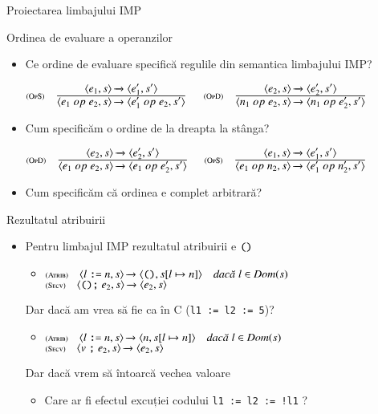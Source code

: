 \documentclass[xcolor=pdftex,romanian,colorlinks]{beamer}
\begin{document}
\begin{section}{Proiectarea limbajului IMP}
\begin{frame}{Ordinea de evaluare a operanzilor}
\begin{itemize}
\item Ce ordine de evaluare specifică regulile din semantica limbajului IMP?
\begin{itemize}
\vitem[] $\reg[OpS]{\Ss{\c{e_1 \mathrel{op} e_2,\stare}}{\c{e_1' \mathrel{op} e_2,\stare'}}}{\Ss{\c{e_1,\stare}}{\c{e_1',\stare'}}}{}$
\vitem[] $\reg[OpD]{\Ss{\c{n_1 \mathrel{op} e_2,\stare}}{\c{n_1 \mathrel{op} e_2',\stare'}}}{\Ss{\c{e_2,\stare}}{\c{e_2',\stare'}}}{}$
\end{itemize}
\item<2-> Cum specificăm o ordine de la dreapta la stânga?
\begin{itemize}
\vitem[] $\reg[OpD]{\Ss{\c{e_1 \mathrel{op} e_2,\stare}}{\c{e_1 \mathrel{op} e_2',\stare'}}}{\Ss{\c{e_2,\stare}}{\c{e_2',\stare'}}}{}$
\vitem[] $\reg[OpS]{\Ss{\c{e_1 \mathrel{op} n_2,\stare}}{\c{e_1' \mathrel{op} n_2',\stare'}}}{\Ss{\c{e_1,\stare}}{\c{e_1',\stare'}}}{}$
\end{itemize}
\item<3-> Cum specificăm că ordinea e complet arbitrară?
\end{itemize}
\end{frame}

\begin{frame}{Rezultatul atribuirii}
\begin{itemize}
\item Pentru limbajul IMP rezultatul atribuirii e $\mathrel{\text{\ttfamily ()}}$
\begin{itemize}
\item[] $\reg[Atrib]{\Ss{\c{l \terminal{:=} n,\stare}}{\c{\Sskip,\stare[l \mapsto n]}}}{}{l\in\Dom(\stare)}$
\vitem[] $\reg[Secv]{\Ss{\c{\Sskip \terminal{;} e_2,\stare}}{\c{e_2,\stare}}}{}{}$
\end{itemize}
 Dar dacă am vrea să fie ca în C (\texttt{l1 := l2 := 5})?
\begin{itemize}
\item[] $\reg[Atrib]{\Ss{\c{l \terminal{:=} n,\stare}}{\c{n,\stare[l \mapsto n]}}}{}{l\in\Dom(\stare)}$
\vitem[] $\reg[Secv]{\Ss{\c{v \terminal{;} e_2,\stare}}{\c{e_2,\stare}}}{}{}$
\end{itemize}
 Dar dacă vrem să întoarcă vechea valoare 
\begin{itemize}
\item Care ar fi efectul excuției codului \texttt{l1 := l2 := !l1} ?
\end{itemize}
\end{itemize}
\end{frame}


\end{section}
\end{document}
